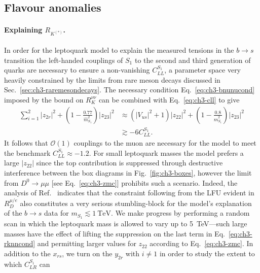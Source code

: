\subsection{Flavour anomalies}

\paragraph{Explaining $R_{K^{(*)}}$.} In order for the leptoquark model to
explain the measured tensions in the $b \to s$ transition the left-handed
couplings of $S_{1}$ to the second and third generation of quarks are necessary
to ensure a non-vanishing $C_{LL}^{S_{1}}$, a parameter space very heavily
constrained by the limits from rare meson decays discussed in
Sec.~\ref{sec:ch3-raremesondecays}. The necessary condition Eq.~\eqref{eq:ch3-bnunucond}
imposed by the bound on $R_K^{\nu\nu}$ can be combined with Eq.~\eqref{eq:ch3-cll}
to give~\cite{Bauer:2015knc}
\begin{equation} \label{eq:ch3-rknncond}
  \begin{split}
    \sum_{i=1}^2 |z_{2r}|^2 + \left( 1 - \frac{0.77}{\hat{m}_{S_{1}}^2}
    \right) |z_{23}|^2 &\approx \left(|V_{us}|^2 + 1\right) |z_{22}|^2 +
    \left( 1 - \frac{0.8}{\hat{m}_{S_{1}}^2} \right) |z_{23}|^2\\ &\gtrsim - 6
    C_{LL}^{S_{1}}.
  \end{split}
\end{equation}
It follows that $\mathscr{O}(1)$ couplings to the muon are necessary for the
model to meet the benchmark $C_{LL}^{S_{1}} \approx -1.2$. For small leptoquark
masses the model prefers a large $|z_{22}|$ since the top contribution is
suppressed through destructive interference between the box diagrams in
Fig.~\ref{fig:ch3-boxes}, however the limit from $D^0 \to \mu \mu$ [see
Eq.~\eqref{eq:ch3-zmc}] prohibits such a scenario. Indeed, the analysis of
Ref.~\cite{Becirevic:2016oho} indicates that the constraint following from the
LFU evident in $R_D^{\mu/e}$ also constitutes a very serious stumbling-block for
the model's explanation of the $b \to s$ data for
$m_{S_{1}} \lesssim \SI{1}{\TeV}$. We make progress by performing a random scan
in which the leptoquark mass is allowed to vary up to \SI{5}{\TeV}---such large
masses have the effect of lifting the suppression on the last term in
Eq.~\eqref{eq:ch3-rknncond} and permitting larger values for $z_{22}$ according
to Eq.~\eqref{eq:ch3-zmc}. In addition to the $x_{rs}$, we turn on the $y_{2r}$
with $i \neq 1$ in order to study the extent to which $C_{LR}^{S_{1}}$ can
